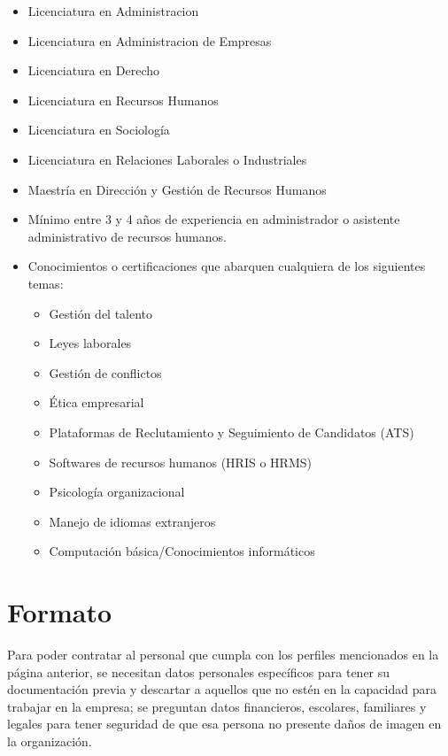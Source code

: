 \documentclass[letterpaper,12pt]{article}
\begin{document}
\begin{sloppypar}
\begin{itemize}
    \item Licenciatura en Administracion
    \item Licenciatura en Administracion de Empresas
    \item Licenciatura en Derecho 
    \item Licenciatura en Recursos Humanos
    \item Licenciatura en Sociología
    \item Licenciatura en Relaciones Laborales o Industriales
    \item Maestría en Dirección y Gestión de Recursos Humanos
    \item Mínimo entre 3 y 4 años de experiencia en administrador o asistente administrativo de recursos humanos. 
    \item Conocimientos o certificaciones que abarquen cualquiera de los siguientes temas: 
    \begin{itemize}
        \item Gestión del talento
        \item Leyes laborales
        \item Gestión de conflictos
        \item Ética empresarial
        \item Plataformas de Reclutamiento y Seguimiento de Candidatos (ATS)
        \item Softwares de recursos humanos (HRIS o HRMS)
        \item Psicología organizacional
        \item Manejo de idiomas extranjeros
        \item Computación básica/Conocimientos informáticos
    \end{itemize}       
\end{itemize}
\newpage
\section{\textcolor[rgb]{0.4,0.4,0.9}{Formato}}
Para poder contratar al personal que cumpla con los perfiles mencionados en la página anterior, se necesitan datos personales específicos para tener su documentación previa y descartar a aquellos que no estén en la capacidad para trabajar en la empresa; se preguntan datos financieros, escolares, familiares y legales para tener seguridad de que esa persona no presente daños de imagen en la organización. 


\end{sloppypar}
\end{document}

